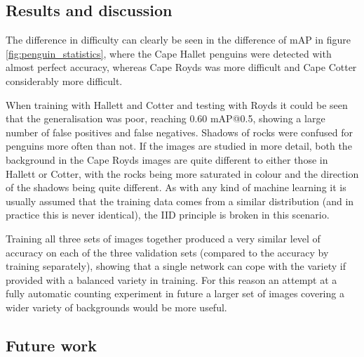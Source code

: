 

\subsection{Results and discussion}
 
The difference in difficulty can clearly be seen in the difference of mAP in figure \ref{fig:penguin_statistics}, where the Cape Hallet penguins were detected with almost perfect accuracy, whereas Cape Royds was more difficult and Cape Cotter considerably more difficult. 

When training with Hallett and Cotter and testing with Royds it could be seen that the generalisation was poor, reaching $0.60$ mAP@0.5, showing a large number of false positives and false negatives. Shadows of rocks were confused for penguins more often than not. If the images are studied in more detail, both the background in the Cape Royds images are quite different to either those in Hallett or Cotter, with the rocks being more saturated in colour and the direction of the shadows being quite different. As with any kind of machine learning it is usually assumed that the training data comes from a similar distribution (and in practice this is never identical), the \gls{IID} principle is broken in this scenario. 

Training all three sets of images together produced a very similar level of accuracy on each of the three validation sets (compared to the accuracy by training separately), showing that a single network can cope with the variety if provided with a balanced variety in training. For this reason an attempt at a fully automatic counting experiment in future a larger set of images covering a wider variety of backgrounds would be more useful. 

\subsection{Future work}


